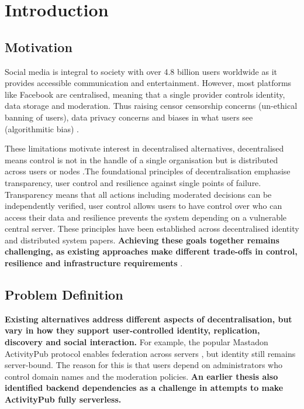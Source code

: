 \section{Introduction}

\subsection{Motivation}
Social media is integral to society with over 4.8 billion users worldwide\cite{umaine_socialmedia_stats} as it provides accessible communication and entertainment. However, most platforms like Facebook 
are centralised, meaning that a single provider controls identity, data storage and moderation. Thus raising censor censorship concerns (un-ethical banning of users), data privacy concerns and biases in what users see (algorithmitic bias) \cite{Ruwe2023}.

These limitations motivate interest in decentralised alternatives, decentralised means control is not in the handle of a single organisation but is distributed across users or nodes \cite{Ruwe2023}.The foundational principles of decentralisation emphasise transparency, user control and resilience against single points of failure. Transparency means that all actions including moderated decisions can be independently verified, user control allows users to have control over who can access their data and resilience prevents the system depending on a vulnerable central server. These principles have been established across decentralised identity and distributed system papers. \textbf{Achieving these goals together remains challenging, as existing approaches make different trade-offs in control, resilience and infrastructure requirements} \cite{w3c_did_core}.


\subsection{Problem Definition}
\textbf{Existing alternatives address different aspects of decentralisation, but vary in how they support user-controlled identity, replication, discovery and social interaction.} For example, the popular Mastadon ActivityPub protocol enables federation across servers \cite{wesleyac_identity_decentralization}, but identity still remains server-bound. The reason for this is that users depend on administrators who control domain names and the moderation policies. \textbf{An earlier thesis also identified backend dependencies as a challenge in attempts to make ActivityPub fully serverless.}

